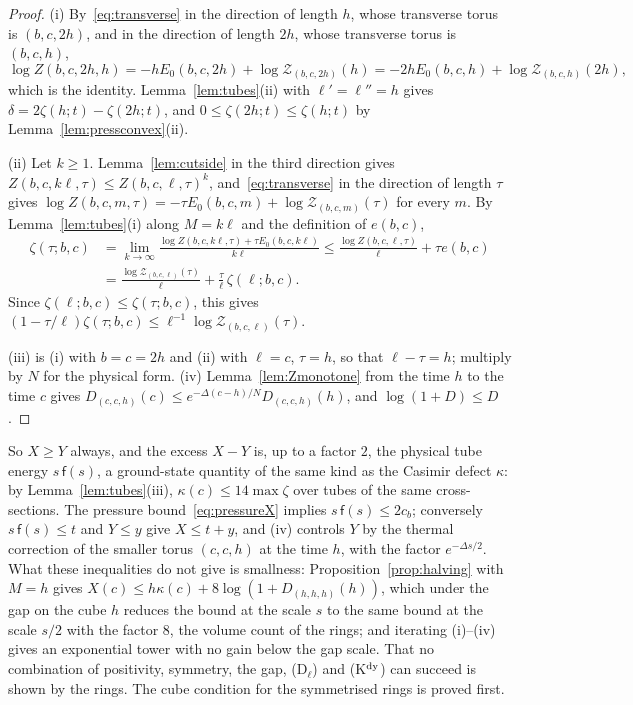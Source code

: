 \begin{proof}
(i) By~\eqref{eq:transverse} in the direction of length $h$, whose
transverse torus is $(b,c,2h)$, and in the direction of length $2h$, whose
transverse torus is $(b,c,h)$,
\[
\log Z(b,c,2h,h)=-hE_0(b,c,2h)+\log\mathcal Z_{(b,c,2h)}(h)=-2hE_0(b,c,h)+
\log\mathcal Z_{(b,c,h)}(2h),
\]
which is the identity. Lemma~\ref{lem:tubes}(ii) with $\ell'=\ell''=h$ gives
$\delta=2\zeta(h;t)-\zeta(2h;t)$, and $0\le\zeta(2h;t)\le\zeta(h;t)$ by
Lemma~\ref{lem:pressconvex}(ii).

(ii) Let $k\ge1$. Lemma~\ref{lem:cutside} in the third direction gives
$Z(b,c,k\ell,\tau)\le Z(b,c,\ell,\tau)^k$, and~\eqref{eq:transverse} in the
direction of length $\tau$ gives $\log Z(b,c,m,\tau)=-\tau E_0(b,c,m)+\log
\mathcal Z_{(b,c,m)}(\tau)$ for every $m$. By Lemma~\ref{lem:tubes}(i) along
$M=k\ell$ and the definition of $e(b,c)$,
\begin{align*}
\zeta(\tau;b,c)&=\lim_{k\to\infty}\frac{\log Z(b,c,k\ell,\tau)+\tau E_0(b,c,k
\ell)}{k\ell}\le\frac{\log Z(b,c,\ell,\tau)}\ell+\tau e(b,c)\\
&=\frac{\log\mathcal Z_{(b,c,\ell)}(\tau)}\ell+\frac\tau\ell\,\zeta(\ell;b,c).
\end{align*}
Since $\zeta(\ell;b,c)\le\zeta(\tau;b,c)$, this gives $(1-\tau/\ell)\zeta(\tau;
b,c)\le\ell^{-1}\log\mathcal Z_{(b,c,\ell)}(\tau)$.

(iii) is (i) with $b=c=2h$ and (ii) with $\ell=c$, $\tau=h$, so that $\ell-\tau
=h$; multiply by $N$ for the physical form. (iv) Lemma~\ref{lem:Zmonotone}
from the time $h$ to the time $c$ gives $D_{(c,c,h)}(c)\le e^{-\Delta(c-h)/N}
D_{(c,c,h)}(h)$, and $\log(1+D)\le D$.
\end{proof}

So $X\ge Y$ always, and the excess $X-Y$ is, up to a factor $2$, the
physical tube energy $s\,\mathsf f(s)$, a ground-state quantity of the same
kind as the Casimir defect $\kappa$: by Lemma~\ref{lem:tubes}(iii), $\kappa(c)
\le14\max\zeta$ over tubes of the same cross-sections. The pressure
bound~\eqref{eq:pressureX} implies $s\,\mathsf f(s)\le2c_b$; conversely $s\,
\mathsf f(s)\le t$ and $Y\le y$ give $X\le t+y$, and (iv) controls $Y$ by the
thermal correction of the smaller torus $(c,c,h)$ at the time $h$, with the
factor $e^{-\Delta s/2}$. What these inequalities do not give is smallness:
Proposition~\ref{prop:halving} with $M=h$ gives $X(c)\le h\kappa(c)+8\log(1+
D_{(h,h,h)}(h))$, which under the gap on the cube $h$ reduces the bound at
the scale $s$ to the same bound at the scale $s/2$ with the factor $8$,
the volume count of the rings; and iterating (i)--(iv) gives an exponential
tower with no gain below the gap scale. That no combination of positivity,
symmetry, the gap, (D$_\ell$) and (K$^{\rm dy}$) can succeed is shown by
the rings. The cube condition for the symmetrised rings is proved first.

